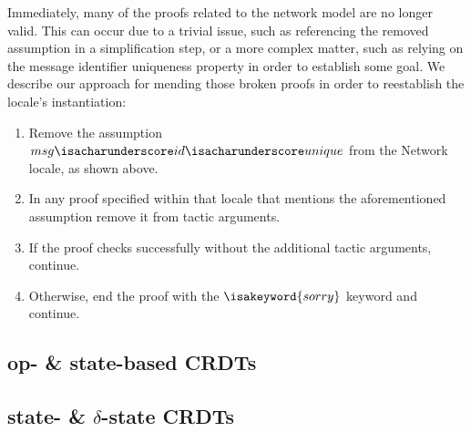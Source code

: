 Immediately, many of the proofs related to the network model are no longer
valid. This can occur due to a trivial issue, such as referencing the removed
assumption in a simplification step, or a more complex matter, such as relying
on the message identifier uniqueness property in order to establish some goal.
We describe our approach for mending those broken proofs in order to reestablish
the locale's instantiation:
\begin{enumerate}
  \item Remove the assumption
    $msg{\isacharunderscore}id{\isacharunderscore}unique$ from the Network
    locale, as shown above.
  \item In any proof specified within that locale that mentions the
    aforementioned assumption remove it from tactic arguments.
  \item If the proof checks successfully without the additional tactic
    arguments, continue.
  \item Otherwise, end the proof with the $\isakeyword{sorry}$ keyword and
    continue.
\end{enumerate}


\subsection{op- \& state-based CRDTs}
\subsection{state- \& $\delta$-state CRDTs}
